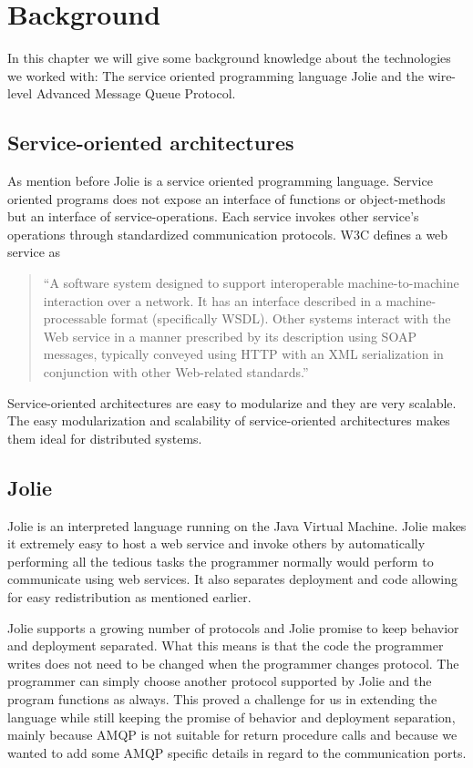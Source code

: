 \section{Background}
In this chapter we will give some background knowledge about the technologies we worked with: The service oriented programming language Jolie and the wire-level Advanced Message Queue Protocol.
\subsection{Service-oriented architectures}
As mention before Jolie is a service oriented programming language. Service oriented programs does not expose an interface of functions or object-methods but an interface of service-operations. Each service invokes other service's operations through standardized communication protocols. W3C defines a web service as

\blockquote{``A software system designed to support interoperable machine-to-machine interaction over a network. It has an interface described in a machine-processable format (specifically WSDL). Other systems interact with the Web service in a manner prescribed by its description using SOAP messages, typically conveyed using HTTP with an XML serialization in conjunction with other Web-related standards.''\cite[W3C, 2004]{W3COnWebServices}}

Service-oriented architectures are easy to modularize and they are very scalable. The easy modularization and scalability of service-oriented architectures makes them ideal for distributed systems.
\subsection{Jolie}
Jolie\cite[Jolie-lang.org]{Jolie} is an interpreted language running on the Java Virtual Machine. Jolie makes it extremely easy to host a web service and invoke others by automatically performing all the tedious tasks the programmer normally would perform to communicate using web services. It also separates deployment and code allowing for easy redistribution as mentioned earlier.

Jolie supports a growing number of protocols and Jolie promise to keep behavior and deployment separated. What this means is that the code the programmer writes does not need to be changed when the programmer changes protocol. The programmer can simply choose another protocol supported by Jolie and the program functions as always. This proved a challenge for us in extending the language while still keeping the promise of behavior and deployment separation, mainly because AMQP is not suitable for return procedure calls and because we wanted to add some AMQP specific details in regard to the communication ports.
